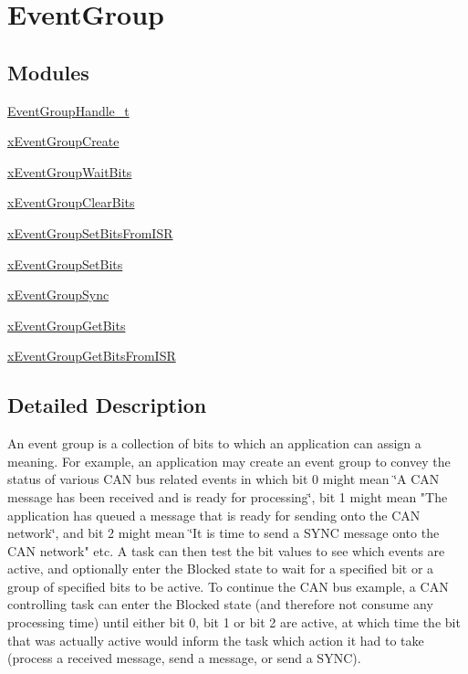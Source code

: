 \hypertarget{group___event_group}{}\section{Event\+Group}
\label{group___event_group}
\subsection*{Modules}
\begin{DoxyCompactItemize}
\item 
\hyperlink{group___event_group_handle__t}{Event\+Group\+Handle\+\_\+t}
\item 
\hyperlink{group__x_event_group_create}{x\+Event\+Group\+Create}
\item 
\hyperlink{group__x_event_group_wait_bits}{x\+Event\+Group\+Wait\+Bits}
\item 
\hyperlink{group__x_event_group_clear_bits}{x\+Event\+Group\+Clear\+Bits}
\item 
\hyperlink{group__x_event_group_set_bits_from_i_s_r}{x\+Event\+Group\+Set\+Bits\+From\+I\+S\+R}
\item 
\hyperlink{group__x_event_group_set_bits}{x\+Event\+Group\+Set\+Bits}
\item 
\hyperlink{group__x_event_group_sync}{x\+Event\+Group\+Sync}
\item 
\hyperlink{group__x_event_group_get_bits}{x\+Event\+Group\+Get\+Bits}
\item 
\hyperlink{group__x_event_group_get_bits_from_i_s_r}{x\+Event\+Group\+Get\+Bits\+From\+I\+S\+R}
\end{DoxyCompactItemize}


\subsection{Detailed Description}
An event group is a collection of bits to which an application can assign a meaning. For example, an application may create an event group to convey the status of various C\+A\+N bus related events in which bit 0 might mean \char`\"{}\+A C\+A\+N
message has been received and is ready for processing\char`\"{}, bit 1 might mean "The application has queued a message that is ready for sending onto the C\+A\+N network\char`\"{}, and bit 2 might mean \char`\"{}It is time to send a S\+Y\+N\+C message onto the C\+A\+N network" etc. A task can then test the bit values to see which events are active, and optionally enter the Blocked state to wait for a specified bit or a group of specified bits to be active. To continue the C\+A\+N bus example, a C\+A\+N controlling task can enter the Blocked state (and therefore not consume any processing time) until either bit 0, bit 1 or bit 2 are active, at which time the bit that was actually active would inform the task which action it had to take (process a received message, send a message, or send a S\+Y\+N\+C).

